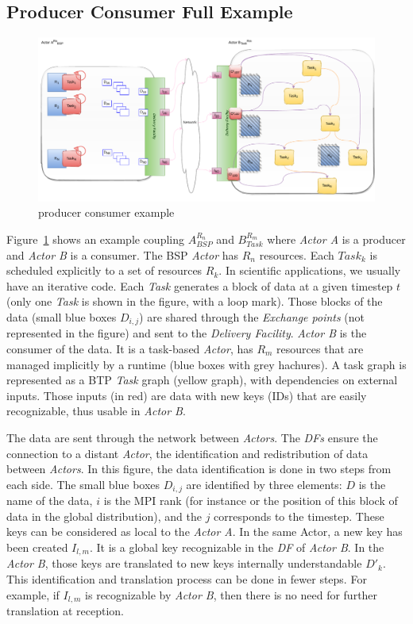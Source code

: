 \subsection{Producer Consumer Full Example}

 
\begin{figure}[tb]\centering
\includegraphics[width=\columnwidth]{figures/BTP.pdf}
\caption{producer consumer example}
\label{figBTP}
\end{figure}

Figure~\ref{figBTP} shows an example coupling $A_{BSP}^{R_{n}}$ and $B_{Task}^{R_{m}}$ where \textit{Actor A} is a producer and \textit{Actor B} is a consumer. The BSP \textit{Actor} has $R_{n}$ resources. Each $Task_k$ is scheduled explicitly to a set of resources $R_{k}$. In scientific applications, we usually have an iterative code. Each \textit{Task} generates a block of data at a given timestep $t$ (only one \textit{Task} is shown in the figure, with a loop mark). Those blocks of the data (small blue boxes $D_{i,j}$) are shared through the \textit{Exchange points} (not represented in the figure) and sent to the \textit{Delivery Facility}.
\textit{Actor B} is the consumer of the data. It is a task-based \textit{Actor}, has $R_{m}$ resources that are managed implicitly by a runtime (blue boxes with grey hachures). A task graph is represented as a BTP \textit{Task} graph (yellow graph), with dependencies on external inputs. Those inputs (in red) are data with new keys (IDs) that are easily recognizable, thus usable in \textit{Actor B}.  

The data are sent through the network between \textit{Actors}. The \textit{DFs} ensure the connection to a distant \textit{Actor}, the identification and redistribution of data between \textit{Actors}. 
In this figure, the data identification is done in two steps from each side. The small blue boxes $D_{i,j}$ are identified by three elements: $D$ is the name of the data, $i$ is the MPI rank (for instance or the position of this block of data in the global distribution), and the $j$ corresponds to the timestep. These keys can be considered as local to the \textit{Actor A}. 
In the same Actor, a new key has been created $I_{l,m}$. It is a global key recognizable in the \textit{DF} of \textit{Actor B}. In the \textit{Actor B}, those keys are translated to new keys internally understandable $D'_{k}$. 
This identification and translation process can be done in fewer steps. For example, if $I_{l,m}$ is recognizable by \textit{Actor B}, then there is no need for further translation at reception.

